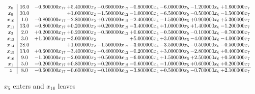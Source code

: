 \documentclass[10pt]{article}
\begin{document}
 \[\begin{array}{c| c c@{\hskip 2pt} c@{\hskip 2pt} c@{\hskip 2pt} c@{\hskip 2pt} c@{\hskip 2pt} c@{\hskip 2pt} c@{\hskip 2pt} }
 x_{8}   &  16.0 & -0.600000 x_{17} & + 5.400000 x_{2} & -0.600000 x_{12} & -0.800000 x_{4} & -6.000000 x_{5} & -1.200000 x_{6} & + 1.600000 x_{7}\\
 x_{9}   &  30.0  &   & + 1.000000 x_{2} & -1.500000 x_{12} & -1.000000 x_{4} & -6.500000 x_{5} & -0.500000 x_{6} & -1.500000 x_{7}\\
 x_{10}   &  1.0 & -0.800000 x_{17} & -2.800000 x_{2} & + 0.700000 x_{12} & -2.400000 x_{4} & -1.500000 x_{5} & + 0.900000 x_{6} & + 5.300000 x_{7}\\
 x_{11}   &  13.0 & -0.800000 x_{17} & + 0.200000 x_{2} & + 0.200000 x_{12} & -3.400000 x_{4} & + 1.000000 x_{5} & + 1.400000 x_{6} & -1.200000 x_{7}\\
 x_{3}   &  2.0 & + 0.200000 x_{17} & + 0.200000 x_{2} & -0.300000 x_{12} & + 0.600000 x_{4} & -0.500000 x_{5} & -0.100000 x_{6} & -0.700000 x_{7}\\
 x_{13}   &  3.0 & + 1.000000 x_{17} & -3.000000 x_{2} &   & + 5.000000 x_{4} & + 3.000000 x_{5} & -4.000000 x_{6} & -4.000000 x_{7}\\
 x_{14}   &  28.0  &   & + 1.000000 x_{2} & -1.500000 x_{12} & -3.000000 x_{4} & -3.500000 x_{5} & -0.500000 x_{6} & -0.500000 x_{7}\\
 x_{15}   &  13.0 & + 0.600000 x_{17} & -3.400000 x_{2} & -0.400000 x_{12} & -0.200000 x_{4} & + 3.000000 x_{5} & -2.800000 x_{6} & + 0.400000 x_{7}\\
 x_{16}   &  9.0 & -1.000000 x_{17} & -2.000000 x_{2} & + 0.500000 x_{12} & -6.000000 x_{4} & + 1.500000 x_{5} & + 2.500000 x_{6} & + 0.500000 x_{7}\\
 x_{1}   &  5.0 & -0.200000 x_{17} & + 0.800000 x_{2} & -0.200000 x_{12} & -0.600000 x_{4} & -1.000000 x_{5} & + 0.600000 x_{6} & + 0.200000 x_{7}\\
\hline
z    &  8.0 & -0.600000 x_{17} & -0.600000 x_{2} & -0.100000 x_{12} & -3.800000 x_{4} & + 0.500000 x_{5} & -0.700000 x_{6} & + 2.100000 x_{7}\\
\end{array}\]


 $ x_{5} $ enters and $ x_{10} $ leaves 
\end{document}
